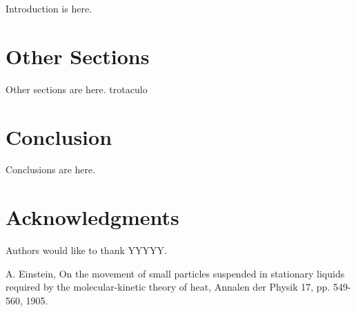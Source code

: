 \documentclass{llncs}
\begin{document}
Introduction is here.

\section{Other Sections}\label{sec:Others}

Other sections are here. 
trotaculo

\section{Conclusion}\label{sec:Conclusion}

Conclusions are here.

\section*{Acknowledgments}\label{sec:Acknowledgments}

Authors would like to thank YYYYY.

\begin{thebibliography}{1}

A. Einstein, On the movement of small particles suspended in stationary liquids required by the molecular-kinetic theory of heat, Annalen der Physik 17, pp. 549-560, 1905.

\end{thebibliography}
\end{document}

